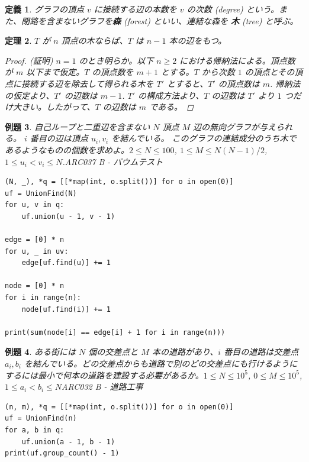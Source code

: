 \documentclass[12pt, a4j]{ltjsarticle}
\newtheorem{thm}{定理}
\newtheorem{defi}[thm]{定義}
\newtheorem{exm}[thm]{例題}
\newcommand*{\SS}{\vspace{1cm}}
\begin{document}
\begin{defi}
グラフの頂点 $v$ に接続する辺の本数を $v$ の次数 (degree) という。また、閉路を含まないグラフを{\bf 森} (forest) といい、連結な森を {\bf 木} (tree) と呼ぶ。
\end{defi}

\SS

\begin{thm}
$T$ が $n$ 頂点の木ならば、$T$ は $n − 1$ 本の辺をもつ。
\begin{proof} (証明) $n=1$ のとき明らか。以下 $n\ge 2$ における帰納法による。頂点数が $m$
以下まで仮定。$T$ の頂点数を $m + 1$ とする。$T$ から次数 $1$ の頂点とその頂点に接続する辺を除去して得られる木を $T'$ とすると、$T'$ の頂点数は $m$. 帰納法の仮定より、$T'$ の辺数は $m − 1$. $T'$ の構成方法より、$T$ の辺数は $T'$ より $1$ つだけ大きい。したがって、$T$ の辺数は $m$ である。

\end{proof}
\end{thm}
\begin{exm}
自己ループと二重辺を含まない $N$ 頂点 $M$ 辺の無向グラフが与えられる。 $i$ 番目の辺は頂点 $u_i,v_i$ を結んでいる。 このグラフの連結成分のうち木であるようなものの個数を求めよ。$2\le N \le 100$, $1\le M \le N(N-1)/2$, $1\le u_i < v_i \le N$.\quad\upshape ARC037 B - バウムテスト\\
\begin{lstlisting}
(N, _), *q = [[*map(int, o.split())] for o in open(0)]
uf = UnionFind(N)
for u, v in q:
    uf.union(u - 1, v - 1)

edge = [0] * n
for u, _ in uv:
    edge[uf.find(u)] += 1

node = [0] * n
for i in range(n):
    node[uf.find(i)] += 1

print(sum(node[i] == edge[i] + 1 for i in range(n)))
\end{lstlisting}
\end{exm}

\newpage

\begin{exm} ある街には $N$ 個の交差点と $M$ 本の道路があり、$i$ 番目の道路は交差点 $a_i,b_i$ を結んでいる。どの交差点からも道路で別のどの交差点にも行けるようにするには最小で何本の道路を建設する必要があるか。$1 \le N \le 10^5$, $0 \le M \le 10^5$, $1 \le a_i < b_i \le N$\upshape\quad ARC032 B - 道路工事\\
\begin{lstlisting}[frame = none]
(n, m), *q = [[*map(int, o.split())] for o in open(0)]
uf = UnionFind(n)
for a, b in q:
    uf.union(a - 1, b - 1)
print(uf.group_count() - 1)
\end{lstlisting}
\end{exm}
\end{document}
